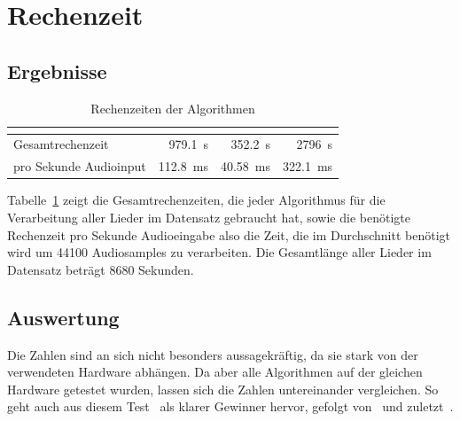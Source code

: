\section{Rechenzeit}
{
	\subsection{Ergebnisse}
	{
		\begin{table}[h]
			\centering
			\begin{tabular}{l | r | r | r}
				                       & \cite{2001_BeatThis} & \cite{2009_DaPlSt}   & \cite{2011_PlRoSt} \\
				\hline \hline
				Gesamtrechenzeit       & \SI{979.1}{\second}  & \SI{352.2}{\second} & \SI{2796}{\second} \\
				pro Sekunde Audioinput & \SI{112.8}{\milli\second} & \SI{40.58}{\milli\second} & \SI{322.1}{\milli\second}
			\end{tabular}
			\caption{Rechenzeiten der Algorithmen}
			\label{tab:cputime}
		\end{table}

		Tabelle~\ref{tab:cputime} zeigt die Gesamtrechenzeiten,
			die jeder Algorithmus für die Verarbeitung aller Lieder im Datensatz gebraucht hat,
			sowie die benötigte Rechenzeit pro Sekunde Audioeingabe
			also die Zeit,
			die im Durchschnitt benötigt wird um \num{44100} Audiosamples zu verarbeiten.
		Die Gesamtlänge aller Lieder im Datensatz beträgt \num{8680} Sekunden.
	}

	\subsection{Auswertung}
	{
		Die Zahlen sind an sich nicht besonders aussagekräftig,
			da sie stark von der verwendeten Hardware abhängen.
		Da aber alle Algorithmen auf der gleichen Hardware getestet wurden,
			lassen sich die Zahlen untereinander vergleichen.
		So geht auch aus diesem Test~\cite{2009_DaPlSt} als klarer Gewinner hervor,
			gefolgt von~\cite{2001_BeatThis} und zuletzt~\cite{2011_PlRoSt}.

}}

